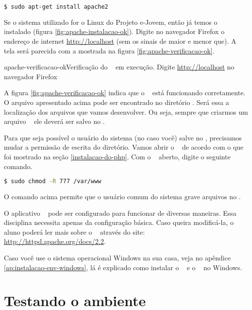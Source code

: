 \begin{lstlisting}[language=bash, style=Comandos]
  $ sudo apt-get install apache2
\end{lstlisting}

Se o sistema utilizado for o Linux do Projeto e-Jovem, então já temos o \apache
\apacheversao~ instalado (figura \ref{fig:apache-instalacao-ok}). Digite no navegador 
Firefox o endereço de internet \url{http://localhost} (sem os sinais de maior e menor que). 
A tela será parecida com a mostrada na figura \ref{fig:apache-verificacao-ok}.

			{apache-verificacao-ok}{Verificação do \apache~ em execução. Digite \url{http://localhost} no navegador Firefox}

A figura \ref{fig:apache-verificacao-ok} indica que o \apache~ está funcionando corretamente.
O arquivo apresentado acima pode ser encontrado no diretório \dirpadrao. Será 
essa a localização dos arquivos que vamos desenvolver. Ou seja, sempre que criarmos
um arquivo \phpextensao~ ele deverá ser salvo no \dirpadrao. 

Para que seja possível o usuário do sistema (no caso você) salve no \dirpadrao,
precisamos mudar a permissão de escrita do diretório. Vamos abrir o \terminal~
de acordo com o que foi mostrado na seção \ref{instalacao-do-php}. Com o \terminal~
aberto, digite o seguinte comando.

\begin{lstlisting}[language=bash]
  $ sudo chmod -R 777 /var/www 
\end{lstlisting}

O comando acima permite que o usuário comum do sistema grave arquivos no \dirpadrao.

O aplicativo \apache~ pode ser configurado para funcionar de diversas maneiras. 
Essa disciplina necessita apenas da configuração básica. Caso queira modificá-la, 
o aluno poderá ler mais sobre o \apache~ através do site: \url{http://httpd.apache.org/docs/2.2}.

Caso você use o sistema operacional Windows na sua casa, veja no apêndice 
\ref{ap:instalacao-env-windows}, lá é explicado como instalar o \php~ e o \apache~ no Windows.


\section{Testando o ambiente}
\label{testando-ambiente}

